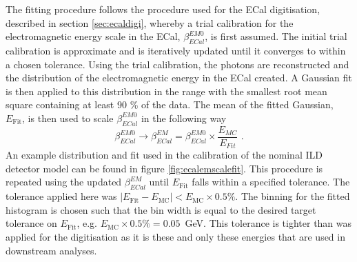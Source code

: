 The fitting procedure follows the procedure used for the ECal digitisation, described in section \ref{sec:ecaldigi}, whereby a trial calibration for the electromagnetic energy scale in the ECal, $\beta^{EM0}_{ECal}$, is first assumed.  The initial trial calibration is approximate and is iteratively updated until it converges to within a chosen tolerance.  Using the trial calibration, the photons are reconstructed and the distribution of the electromagnetic energy in the ECal created.  A Gaussian fit is then applied to this distribution in the range with the smallest root mean square containing at least 90 \% of the data.  The mean of the fitted Gaussian, $E_{\text{Fit}}$, is then used to scale $\beta^{EM0}_{ECal}$ in the following way
%
\begin{equation}
\beta^{EM0}_{ECal} \rightarrow \beta^{EM}_{ECal} = \beta^{EM0}_{ECal} \times \frac{E_{MC}}{E_{Fit}}\text{ .}
\end{equation}
%
An example distribution and fit used in the calibration of the nominal ILD detector model can be found in figure \ref{fig:ecalemscalefit}.  This procedure is repeated using the updated $\beta^{EM}_{ECal}$ until $E_{\text{Fit}}$ falls within a specified tolerance.  The tolerance applied here was $|E_{\text{Fit}} - E_{\text{MC}}| < E_{\text{MC}} \times 0.5 \%$.  The binning for the fitted histogram is chosen such that the bin width is equal to the desired target tolerance on $E_{\text{Fit}}$, e.g. $E_{\text{MC}} \times 0.5 \% = 0.05$~GeV.  This tolerance is tighter than was applied for the digitisation as it is these and only these energies that are used in downstream analyses.   
 

